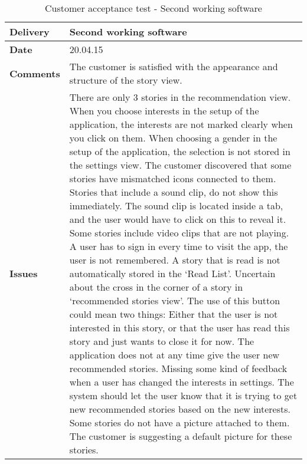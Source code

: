 \renewcommand{\arraystretch}{2}%
\begin{center}
	\begin{longtable}{ | p{4cm} | p{13cm} | }
		
		\caption[Customer acceptance test - Second working software]{Customer acceptance test - Second working software} \label{Tab:cattest4}\\
		\hline
		\textbf{Delivery} & Second working software\\ \hline
		\textbf{Date} & 20.04.15\\ \hline
		\textbf{Comments} & The customer is satisfied with the appearance and structure of the story view. 
		\\ \hline
		\textbf{Issues} & 
		There are only 3 stories in the recommendation view. When you choose interests in the setup of the application, the interests are not marked clearly when you click on them. When choosing a gender in the setup of the application, the selection is not stored in the settings view. The customer discovered that some stories have mismatched icons connected to them. Stories that include a sound clip, do not show this immediately. The sound clip is located inside a tab, and the user would have to click on this to reveal it. Some stories include video clips that are not playing. A user has to sign in every time to visit the app, the user is not remembered. A story that is read is not automatically stored in the ‘Read List’. Uncertain about the cross in the corner of a story in ‘recommended stories view’. The use of this button could mean two things: Either that the user is not interested in this story, or that the user has read this story and just wants to close it for now. The application does not at any time give the user new recommended stories. Missing some kind of feedback when a user has changed the interests in settings. The system should let the user know that it is trying to get new recommended stories based on the new interests. Some stories do not have a picture attached to them. The customer is suggesting a default picture for these stories.
		\\ \hline 	
	\end{longtable}
\end{center}

